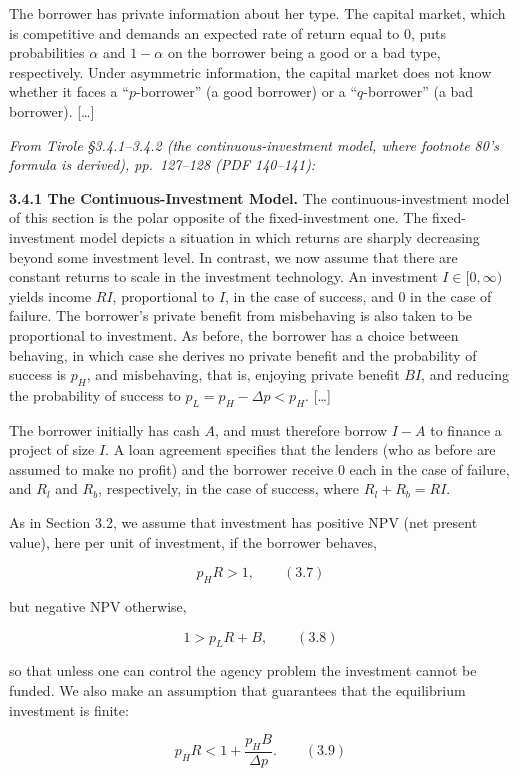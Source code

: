 \documentclass[11pt,a4paper]{article}
\begin{document}
The borrower has private information about her type. The capital market, which is competitive and
demands an expected rate of return equal to 0, puts probabilities \(\alpha\) and \(1 - \alpha\) on
the borrower being a good or a bad type, respectively. Under asymmetric information, the capital
market does not know whether it faces a ``\(p\)-borrower'' (a good borrower) or a ``\(q\)-borrower''
(a bad borrower). {[}\ldots{]}

\emph{From Tirole §3.4.1--3.4.2 (the continuous-investment model, where footnote 80's formula is
derived), pp.~127--128 (PDF 140--141):}

\textbf{3.4.1 The Continuous-Investment Model.} The continuous-investment model of this section is
the polar opposite of the fixed-investment one. The fixed-investment model depicts a situation in
which returns are sharply decreasing beyond some investment level. In contrast, we now assume that
there are constant returns to scale in the investment technology. An investment
\(I \in [0, \infty)\) yields income \(RI\), proportional to \(I\), in the case of success, and 0 in
the case of failure. The borrower's private benefit from misbehaving is also taken to be
proportional to investment. As before, the borrower has a choice between behaving, in which case she
derives no private benefit and the probability of success is \(p_H\), and misbehaving, that is,
enjoying private benefit \(BI\), and reducing the probability of success to
\(p_L = p_H - \Delta p < p_H\). {[}\ldots{]}

The borrower initially has cash \(A\), and must therefore borrow \(I - A\) to finance a project of
size \(I\). A loan agreement specifies that the lenders (who as before are assumed to make no
profit) and the borrower receive 0 each in the case of failure, and \(R_l\) and \(R_b\),
respectively, in the case of success, where \(R_l + R_b = RI\).

As in Section 3.2, we assume that investment has positive NPV (net present value), here per unit of
investment, if the borrower behaves,

\[p_H R > 1, \qquad (3.7)\]

but negative NPV otherwise,

\[1 > p_L R + B, \qquad (3.8)\]

so that unless one can control the agency problem the investment cannot be funded. We also make an
assumption that guarantees that the equilibrium investment is finite:

\[p_H R < 1 + \frac{p_H B}{\Delta p}. \qquad (3.9)\]
\end{document}
